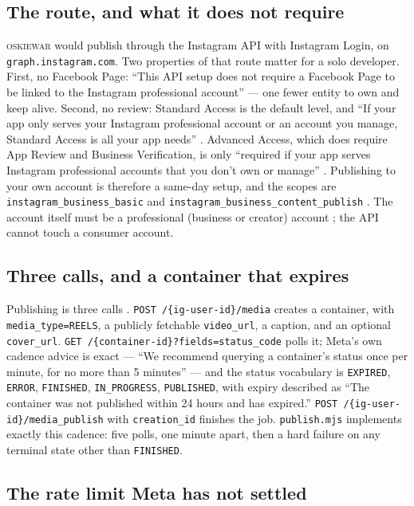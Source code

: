\documentclass[10pt,letterpaper,twocolumn]{article}
\newcommand{\game}{\textsc{oskiewar}}
\newcommand{\code}[1]{\texttt{#1}}
\begin{document}
\subsection{The route, and what it does not require}

\game{} would publish through the Instagram API with Instagram Login, on
\code{graph.instagram.com}. Two properties of that route matter for a solo
developer. First, no Facebook Page: ``This API setup does not require a Facebook
Page to be linked to the Instagram professional account'' \cite{metaIgLogin} ---
one fewer entity to own and keep alive. Second, no review: Standard Access is
the default level, and ``If your app only serves your Instagram professional
account or an account you manage, Standard Access is all your app needs''
\cite{metaOverview}. Advanced Access, which does require App Review and Business
Verification, is only ``required if your app serves Instagram professional
accounts that you don't own or manage'' \cite{metaOverview}. Publishing to your
own account is therefore a same-day setup, and the scopes are
\code{instagram\_business\_basic} and
\code{instagram\_business\_content\_publish} \cite{metaPublishing,metaIgLogin}.
The account itself must be a professional (business or creator) account
\cite{metaOverview}; the API cannot touch a consumer account.

\subsection{Three calls, and a container that expires}

Publishing is three calls \cite{metaPublishing}. \code{POST /\{ig-user-id\}/media}
creates a container, with \code{media\_type=REELS}, a publicly fetchable
\code{video\_url}, a caption, and an optional \code{cover\_url}.
\code{GET /\{container-id\}?fields=status\_code} polls it; Meta's own cadence
advice is exact --- ``We recommend querying a container's status once per
minute, for no more than 5 minutes'' --- and the status vocabulary is
\code{EXPIRED}, \code{ERROR}, \code{FINISHED}, \code{IN\_PROGRESS},
\code{PUBLISHED}, with expiry described as ``The container was not published
within 24 hours and has expired.'' \code{POST /\{ig-user-id\}/media\_publish}
with \code{creation\_id} finishes the job. \code{publish.mjs} implements exactly
this cadence: five polls, one minute apart, then a hard failure on any terminal
state other than \code{FINISHED}.

\subsection{The rate limit Meta has not settled}
\end{document}
